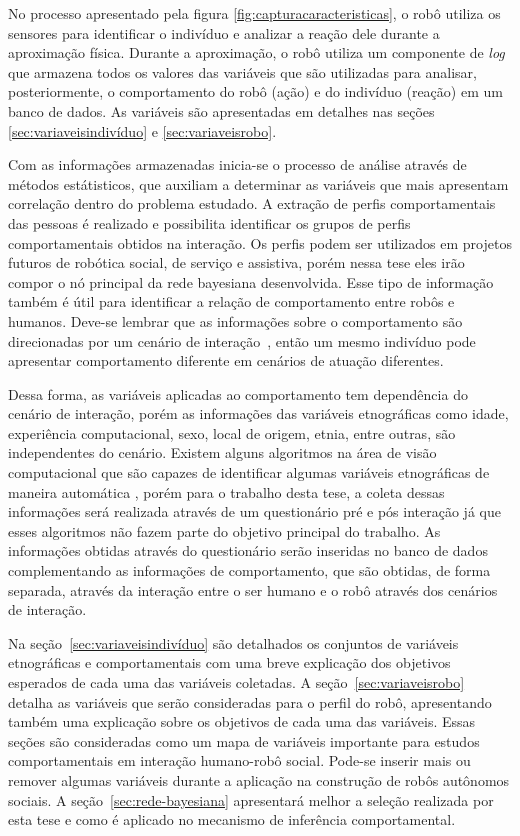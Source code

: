 No processo apresentado pela figura \ref{fig:capturacaracteristicas}, o robô utiliza os sensores para identificar o indivíduo e analizar a reação dele durante a aproximação física. Durante a aproximação, o robô utiliza um componente de \emph{log} que armazena todos os valores das variáveis que são utilizadas para analisar, posteriormente, o comportamento do robô (ação) e do indivíduo (reação) em um banco de dados. As variáveis são apresentadas em detalhes nas seções \ref{sec:variaveisindivíduo} e \ref{sec:variaveisrobo}.

Com as informações armazenadas inicia-se o processo de análise através de métodos estátisticos, que auxiliam a determinar as variáveis que mais apresentam correlação dentro do problema estudado. A extração de perfis comportamentais das pessoas é realizado e possibilita identificar os grupos de perfis comportamentais obtidos na interação. Os perfis podem ser utilizados em projetos futuros de robótica social, de serviço e assistiva, porém nessa tese eles irão compor o nó principal da rede bayesiana desenvolvida. Esse tipo de informação também é útil para identificar a relação de comportamento entre robôs e humanos. Deve-se lembrar que as informações sobre o comportamento são direcionadas por um cenário de interação~\cite{jung:1991}, então um mesmo indivíduo pode apresentar comportamento diferente em cenários de atuação diferentes.

Dessa forma, as variáveis aplicadas ao comportamento tem dependência do cenário de interação, porém as informações das variáveis etnográficas como idade, experiência computacional, sexo, local de origem, etnia, entre outras, são independentes do cenário. Existem alguns algoritmos na área de visão computacional que são capazes de identificar algumas variáveis etnográficas de maneira automática \cite{yang:2007, shan:2012, ylioinas:2012, samadi:2013, amaral:2014}, porém para o trabalho desta tese, a coleta dessas informações será realizada através de um questionário pré e pós interação já que esses algoritmos não fazem parte do objetivo principal do trabalho. As informações obtidas através do questionário serão inseridas no banco de dados complementando as informações de comportamento, que são obtidas, de forma separada, através da interação entre o ser humano e o robô através dos cenários de interação.

Na seção~\ref{sec:variaveisindivíduo} são detalhados os conjuntos de variáveis etnográficas e comportamentais com uma breve explicação dos objetivos esperados de cada uma das variáveis coletadas. A seção~\ref{sec:variaveisrobo} detalha as variáveis que serão consideradas para o perfil do robô, apresentando também uma explicação sobre os objetivos de cada uma das variáveis. Essas seções são consideradas como um mapa de variáveis importante para estudos comportamentais em interação humano-robô social. Pode-se inserir mais ou remover algumas variáveis durante a aplicação na construção de robôs autônomos sociais. A seção~\ref{sec:rede-bayesiana} apresentará melhor a seleção realizada por esta tese e como é aplicado no mecanismo de inferência comportamental.

